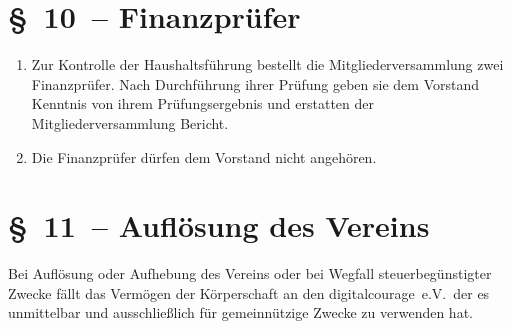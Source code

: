 \documentclass[11pt,DIV12]{scrartcl}
\begin{document}
\section*{§~10~-- Finanzprüfer}
\begin{enumerate}
\item Zur Kontrolle der Haushaltsführung bestellt die Mitgliederversammlung zwei Finanzprüfer. Nach Durchführung ihrer Prüfung geben sie dem Vorstand Kenntnis von ihrem Prüfungsergebnis und erstatten der Mitgliederversammlung Bericht.
\item Die Finanzprüfer dürfen dem Vorstand nicht angehören.
\end{enumerate}

\section*{§~11~-- Auflösung des Vereins}
Bei Auflösung oder Aufhebung des Vereins oder bei Wegfall steuerbegünstigter Zwecke fällt das Vermögen der Körperschaft an den digitalcourage~e.V.\ der es unmittelbar und ausschließlich für gemeinnützige Zwecke zu verwenden hat.
\end{document}
